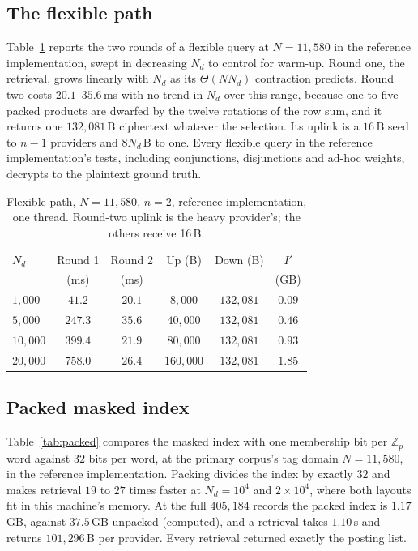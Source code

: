 \documentclass[a4paper,fleqn]{cas-sc}
\begin{document}
\subsection{The flexible path}
\label{sec:flexresult}
Table~\ref{tab:flex} reports the two rounds of a flexible query at
$N=11{,}580$ in the reference implementation, swept in decreasing $N_d$ to
control for warm-up. Round one, the retrieval, grows linearly with $N_d$ as
its $\Theta(NN_d)$ contraction predicts. Round two costs $20.1$--$35.6$\,ms
with no trend in $N_d$ over this range, because one to five packed products are
dwarfed by the twelve rotations of the row sum, and it returns one
$132{,}081$\,B ciphertext whatever the selection. Its uplink is a $16$\,B seed
to $n-1$ providers and $8N_d$\,B to one. Every flexible query in the reference implementation's tests, including
conjunctions, disjunctions and ad-hoc weights, decrypts to the plaintext ground
truth.

\begin{table}[pos=htbp]
\caption{Flexible path, $N=11{,}580$, $n=2$, reference implementation, one
thread. Round-two uplink is the heavy provider's; the others receive 16\,B.}
\label{tab:flex}
\centering
\footnotesize
\setlength{\tabcolsep}{2pt}
\begin{tabular*}{\tblwidth}{@{\extracolsep{\fill}}lccccc@{}}
\toprule
$N_d$ & Round 1 & Round 2 & Up (B) & Down (B) & $I'$ \\
      & (ms)    & (ms)    &        &          & (GB) \\
\midrule
$1{,}000$ & $41.2$ & $20.1$ & $8{,}000$ & $132{,}081$ & $0.09$ \\
$5{,}000$ & $247.3$ & $35.6$ & $40{,}000$ & $132{,}081$ & $0.46$ \\
$10{,}000$ & $399.4$ & $21.9$ & $80{,}000$ & $132{,}081$ & $0.93$ \\
$20{,}000$ & $758.0$ & $26.4$ & $160{,}000$ & $132{,}081$ & $1.85$ \\
\bottomrule
\end{tabular*}
\end{table}

\subsection{Packed masked index}
\label{sec:packedresult}
Table~\ref{tab:packed} compares the masked index with one membership bit per
$\mathbb{Z}_p$ word against $32$ bits per word, at the primary corpus's tag
domain $N=11{,}580$, in the reference implementation. Packing divides the index
by exactly $32$ and makes retrieval $19$ to $27$ times faster at
$N_d=10^4$ and $2\times10^4$, where both layouts fit in this machine's memory.
At the full $405{,}184$ records the packed index is $1.17$\,GB, against
$37.5$\,GB unpacked (computed), and a retrieval takes $1.10$\,s and returns
$101{,}296$\,B per provider. Every retrieval returned exactly the posting list.
\end{document}
